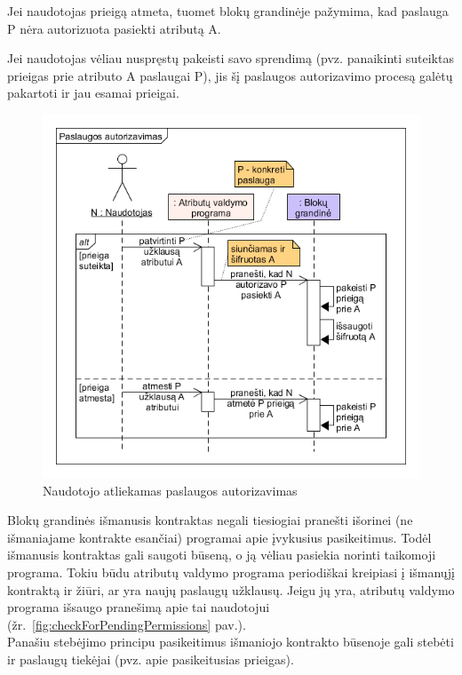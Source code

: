 Jei naudotojas prieigą atmeta, tuomet blokų grandinėje pažymima, kad paslauga P nėra autorizuota pasiekti atributą A.

Jei naudotojas vėliau nuspręstų pakeisti savo sprendimą (pvz. panaikinti suteiktas prieigas prie atributo A paslaugai P),
jis šį paslaugos autorizavimo procesą galėtų pakartoti ir jau esamai prieigai.


\begin{figure}[h]
    \centering
    \includegraphics[scale=0.65]{img/givePermissions}
    \caption{Naudotojo atliekamas paslaugos autorizavimas}
    \label{fig:givePermissions}
\end{figure}


Blokų grandinės išmanusis kontraktas negali tiesiogiai pranešti išorinei (ne išmaniajame kontrakte esančiai) programai
apie įvykusius pasikeitimus. Todėl išmanusis kontraktas gali saugoti būseną, o ją vėliau pasiekia norinti taikomoji programa.
Tokiu būdu atributų valdymo programa periodiškai kreipiasi į išmanųjį kontraktą ir žiūri, ar yra naujų paslaugų užklausų. Jeigu jų yra,
atributų valdymo programa išsaugo pranešimą apie tai naudotojui (žr.\hypertarget{fig:checkForPendingPermissions}{~\ref{fig:checkForPendingPermissions} pav.}).\\
Panašiu stebėjimo principu pasikeitimus išmaniojo kontrakto būsenoje gali stebėti ir paslaugų tiekėjai
(pvz. apie pasikeitusias prieigas).


